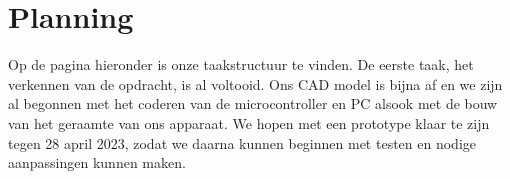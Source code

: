 \documentclass[kulak]{kulakarticle} %
\begin{document}


\section{Planning}
	Op de pagina hieronder is onze taakstructuur te vinden. De eerste taak, het verkennen van de opdracht, is al voltooid. Ons CAD model is bijna af en we zijn al begonnen met het coderen van de microcontroller en PC alsook met de bouw van het geraamte van ons apparaat. We hopen met een prototype klaar te zijn tegen 28 april 2023, zodat we daarna kunnen beginnen met testen en nodige aanpassingen kunnen maken.
	
\end{document}
